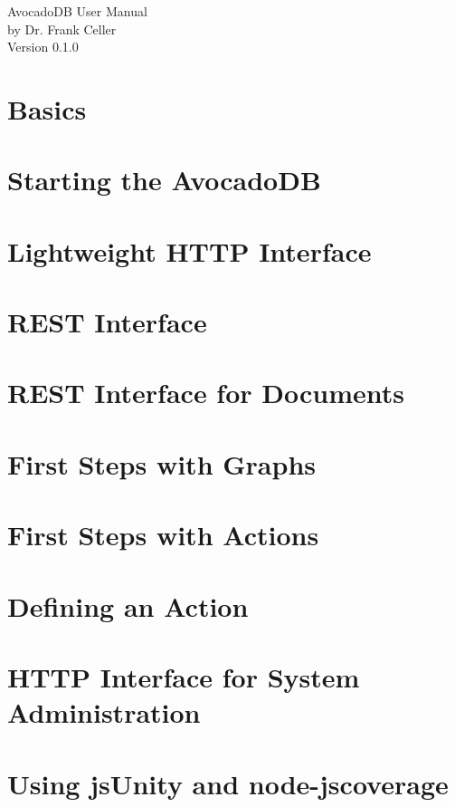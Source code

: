 \documentclass[a4paper]{book}
\begin{document}
\begin{titlepage}
\vspace*{7cm}
\begin{center}
{\Large AvocadoDB User Manual }\\
\vspace*{1cm}
{\large by Dr. Frank Celler}\\
\vspace*{0.5cm}
{\small Version 0.1.0}\\
\end{center}
\end{titlepage}
\clearemptydoublepage
{}
\tableofcontents
\clearemptydoublepage
{}
\chapter{Basics}
\label{Basics}

\chapter{Starting the AvocadoDB}
\label{StartStop}

\chapter{Lightweight HTTP Interface}
\label{HttpInterface}

\chapter{REST Interface}
\label{RestInterface}

\chapter{REST Interface for Documents}
\label{RestDocument}

\chapter{First Steps with Graphs}
\label{Graphs}

\chapter{First Steps with Actions}
\label{Actions}

\chapter{Defining an Action}
\label{DefineAction}

\chapter{HTTP Interface for System Administration}
\label{RestSystem}

\chapter{Using jsUnity and node-\/jscoverage}
\label{jsUnity}

\printindex
\end{document}
